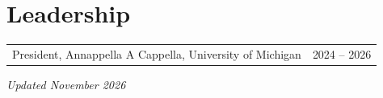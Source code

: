 \documentclass[11pt,letterpaper]{article}
\begin{document}
\section*{Leadership}
\begin{tabularx}{\textwidth}{@{}Xr@{}}
President, Annappella A Cappella, University of Michigan & 2024 -- 2026
\end{tabularx}

\vspace{1.5em}
\hfill{\small\textit{Updated November 2026}}
\end{document}
